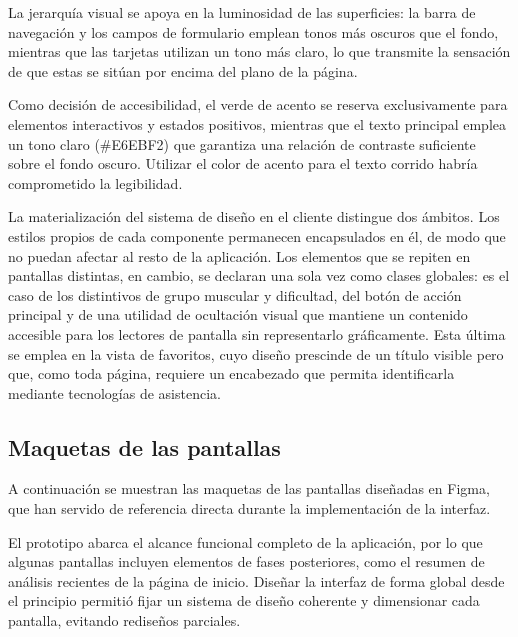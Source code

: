 \documentclass[12pt,a4paper,twoside,openright]{book}
\begin{document}
    La jerarquía visual se apoya en la luminosidad de las superficies: la barra
    de navegación y los campos de formulario emplean tonos más oscuros que el
    fondo, mientras que las tarjetas utilizan un tono más claro, lo que
    transmite la sensación de que estas se sitúan por encima del plano de la
    página.

    Como decisión de accesibilidad, el verde de acento se reserva
    exclusivamente para elementos interactivos y estados positivos, mientras
    que el texto principal emplea un tono claro (\#E6EBF2) que garantiza una
    relación de contraste suficiente sobre el fondo oscuro. Utilizar el color
    de acento para el texto corrido habría comprometido la legibilidad.

    La materialización del sistema de diseño en el cliente distingue dos
    ámbitos. Los estilos propios de cada componente permanecen encapsulados en
    él, de modo que no puedan afectar al resto de la aplicación. Los elementos
    que se repiten en pantallas distintas, en cambio, se declaran una sola vez
    como clases globales: es el caso de los distintivos de grupo muscular y
    dificultad, del botón de acción principal y de una utilidad de ocultación
    visual que mantiene un contenido accesible para los lectores de pantalla
    sin representarlo gráficamente. Esta última se emplea en la vista de
    favoritos, cuyo diseño prescinde de un título visible pero que, como toda
    página, requiere un encabezado que permita identificarla mediante
    tecnologías de asistencia.

    \subsection{Maquetas de las pantallas}

    A continuación se muestran las maquetas de las pantallas diseñadas en
    Figma, que han servido de referencia directa durante la implementación de
    la interfaz.

    El prototipo abarca el alcance funcional completo de la aplicación, por lo
    que algunas pantallas incluyen elementos de fases posteriores, como el resumen
    de análisis recientes de la página de inicio. Diseñar la interfaz de forma
    global desde el principio permitió fijar un sistema de diseño coherente y
    dimensionar cada pantalla, evitando rediseños parciales.
\end{document}
